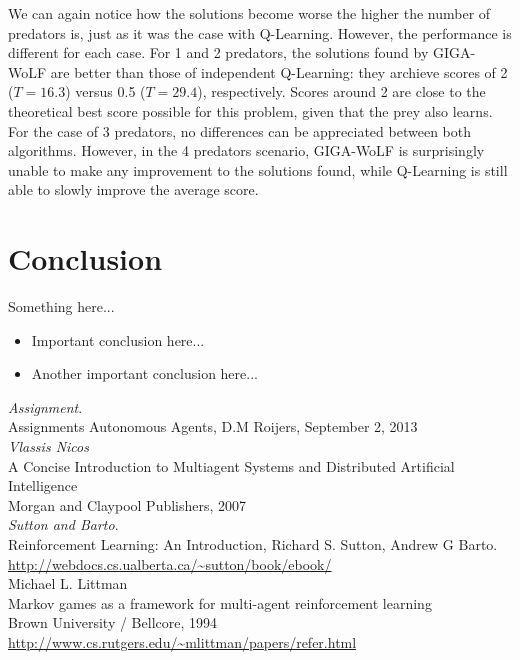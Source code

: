\documentclass[a4paper,12pt]{article}
\begin{document}
We can again notice how the solutions become worse the higher the number of predators is, just as it was the case with Q-Learning. However, the performance is different for each case. For 1 and 2 predators, the solutions found by GIGA-WoLF are better than those of independent Q-Learning: they archieve scores of 2 ($T = 16.3 $) versus 0.5 ($T = 29.4$), respectively. Scores around 2 are close to the theoretical best score possible for this problem, given that the prey also learns. For the case of 3 predators, no differences can be appreciated between both algorithms. However, in the 4 predators scenario, GIGA-WoLF is surprisingly unable to make any improvement to the solutions found, while Q-Learning is still able to slowly improve the average score.

\section{Conclusion}

Something here...

\begin{itemize}
 \item Important conclusion here...
 \item Another important conclusion here...
\end{itemize}

\thebibliography{}
  \emph{Assignment}.\\
  Assignments Autonomous Agents, D.M Roijers, September 2, 2013 \\

	\emph{Vlassis Nicos} \\
	A Concise Introduction to Multiagent Systems and Distributed Artificial Intelligence \\
	Morgan and Claypool Publishers, 2007 \\

  \emph{Sutton and Barto}.\\
  Reinforcement Learning: An Introduction, Richard S. Sutton, Andrew G Barto. \\
  \url{http://webdocs.cs.ualberta.ca/~sutton/book/ebook/} \\
 
 Michael L. Littman \\
 Markov games as a framework for multi-agent reinforcement learning \\
 Brown University / Bellcore, 1994 \\
 \url{http://www.cs.rutgers.edu/~mlittman/papers/refer.html} \\
 
\end{document}
